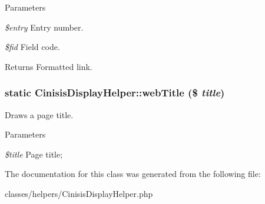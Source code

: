 \begin{DoxyParams}{Parameters}
\item[{\em \$entry}]Entry number.\item[{\em \$fid}]Field code.\end{DoxyParams}
\begin{DoxyReturn}{Returns}
Formatted link. 
\end{DoxyReturn}
\hypertarget{classCinisisDisplayHelper_af3849efbba5e6980ddfdb4ceddb6ad17}{
\subsubsection[{webTitle}]{\setlength{\rightskip}{0pt plus 5cm}static CinisisDisplayHelper::webTitle (\$ {\em title})}}
\label{classCinisisDisplayHelper_af3849efbba5e6980ddfdb4ceddb6ad17}
Draws a page title.


\begin{DoxyParams}{Parameters}
\item[{\em \$title}]Page title; \end{DoxyParams}


The documentation for this class was generated from the following file:\begin{DoxyCompactItemize}
\item 
classes/helpers/CinisisDisplayHelper.php\end{DoxyCompactItemize}
